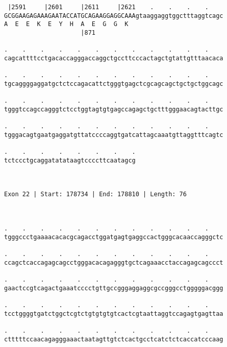 \documentclass{article}
\begin{document}
\begin{Verbatim}
 |2591     |2601     |2611     |2621    .    .    .    .    
GCGGAAGAGAAAGAATACCATGCAGAAGGAGGCAAAgtaaggaggtggctttaggtcagc
A  E  E  K  E  Y  H  A  E  G  G  K                          
                     |871                                   
  
.    .    .    .    .    .    .    .    .    .    .    .    
cagcattttcctgacaccagggaccaggctgccttcccactagctgtattgtttaacaca
                                                            
.    .    .    .    .    .    .    .    .    .    .    .    
tgcaggggaggatgctctccagacattctgggtgagctcgcagcagctgctgctggcagc
                                                            
.    .    .    .    .    .    .    .    .    .    .    .    
tgggtccagccagggtctcctggtagtgtgagccagagctgctttgggaacagtacttgc
                                                            
.    .    .    .    .    .    .    .    .    .    .    .    
tgggacagtgaatgaggatgttatccccaggtgatcattagcaaatgttaggtttcagtc
                                                            
.    .    .    .    .    .    .    .
tctccctgcaggatatataagtccccttcaatagcg
                                    
                                    
 
Exon 22 | Start: 178734 | End: 178810 | Length: 76



.    .    .    .    .    .    .    .    .    .    .    .    
tgggccctgaaaacacacgcagacctggatgagtgaggccactgggcacaaccagggctc
                                                            
.    .    .    .    .    .    .    .    .    .    .    .    
ccagctcaccagagcagcctgggacacagagggtgctcagaaacctaccagagcagccct
                                                            
.    .    .    .    .    .    .    .    .    .    .    .    
gaactccgtcagactgaaatcccctgttgccgggaggaggcgccgggcctgggggacggg
                                                            
.    .    .    .    .    .    .    .    .    .    .    .    
tcctggggtgatctggctcgtctgtgtgtgtcactcgtaattaggtccagagtgagttaa
                                                            
.    .    .    .    .    .    .    .    .    .    .    .    
ctttttccaacagagggaaactaatagttgtctcactgcctcatctctcaccatcccaag
                                                            

\end{Verbatim}
\end{document}
